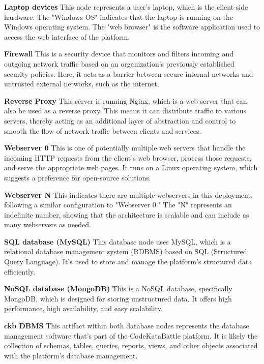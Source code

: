 \noindent\textbf{Laptop devices}\newline
This node represents a user's laptop, which is the client-side hardware. The "Windows OS" indicates that the laptop is running on the Windows operating system. 
The "web browser" is the software application used to access the web interface of the platform.

\noindent\textbf{Firewall}\newline
This is a security device that monitors and filters incoming and outgoing network traffic based on an organization's previously established security policies. 
Here, it acts as a barrier between secure internal networks and untrusted external networks, such as the internet.

\noindent\textbf{Reverse Proxy}\newline
This server is running Nginx, which is a web server that can also be used as a reverse proxy. This means it can distribute traffic to various servers, 
thereby acting as an additional layer of abstraction and control to smooth the flow of network traffic between clients and services.

\noindent\textbf{Webserver 0}\newline
This is one of potentially multiple web servers that handle the incoming HTTP requests from the client's web browser, process those requests, 
and serve the appropriate web pages. It runs on a Linux operating system, which suggests a preference for open-source solutions.

\noindent\textbf{Webserver N}\newline
This indicates there are multiple webservers in this deployment, following a similar configuration to "Webserver 0." 
The "N" represents an indefinite number, showing that the architecture is scalable and can include as many webservers as needed.

\noindent\textbf{SQL database (MySQL)}\newline
This database node uses MySQL, which is a relational database management system (RDBMS) based on SQL (Structured Query Language). 
It's used to store and manage the platform's structured data efficiently.

\noindent\textbf{NoSQL database (MongoDB)}\newline
This is a NoSQL database, specifically MongoDB, which is designed for storing unstructured data. It offers high performance, high availability, and easy scalability.

\noindent\textbf{ckb DBMS}\newline
This artifact within both database nodes represents the database management software that's part of the CodeKataBattle platform. It is likely the collection of schemas, 
tables, queries, reports, views, and other objects associated with the platform's database management.

